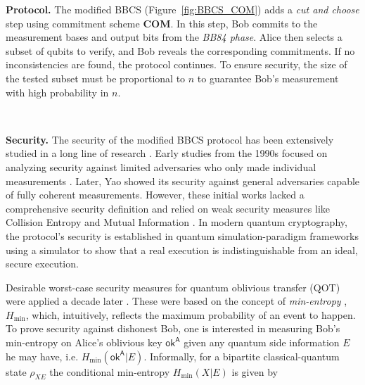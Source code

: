 \noindent\textbf{Protocol.} The modified BBCS (Figure~\ref{fig:BBCS_COM}) adds a \textit{cut and choose} step using commitment scheme \textbf{COM}. In this step, Bob commits to the measurement bases and output bits from the \textit{BB84 phase}. Alice then selects a subset of qubits to verify, and Bob reveals the corresponding commitments. If no inconsistencies are found, the protocol continues. To ensure security, the size of the tested subset must be proportional to $n$ to guarantee Bob's measurement with high probability in $n$.

\

\noindent\textbf{Security.} The security of the modified BBCS protocol has been extensively studied in a long line of research \cite{CK88, BBCS92, MS94, Y95, M96b, CDMS04, FS09, DFLSS09, U10, BF10, GLSV21, BCKM21}. Early studies from the 1990s focused on analyzing security against limited adversaries who only made individual measurements \cite{MS94}. Later, Yao \cite{Y95} showed its security against general adversaries capable of fully coherent measurements. However, these initial works \cite{MS94, Y95, M96b} lacked a comprehensive security definition and relied on weak security measures like Collision Entropy and Mutual Information \cite{BCC+10, TR11}. In modern quantum cryptography, the protocol's security is established in quantum simulation-paradigm frameworks \cite{FS09, U10, DFLSS09, KWW12} using a simulator to show that a real execution is indistinguishable from an ideal, secure execution.


Desirable worst-case security measures for quantum oblivious transfer (QOT) were applied a decade later \cite{R06, DFRSS07}. These were based on the concept of \textit{min-entropy} \cite{BCC+10,TR11}, $H_{\text{min}}$, which, intuitively, reflects the maximum probability of an event to happen. To prove security against dishonest Bob, one is interested in measuring Bob's min-entropy on Alice's oblivious key $\mathsf{ok}^{\mathsf{A}}$ given any quantum side information $E$ he may have, i.e. $H_{\text{min}}(\mathsf{ok}^{\mathsf{A}} | E)$. Informally, for a bipartite classical-quantum state $\rho_{X E}$ the conditional min-entropy $H_{\text{min}}(X | E)$ is given by 

